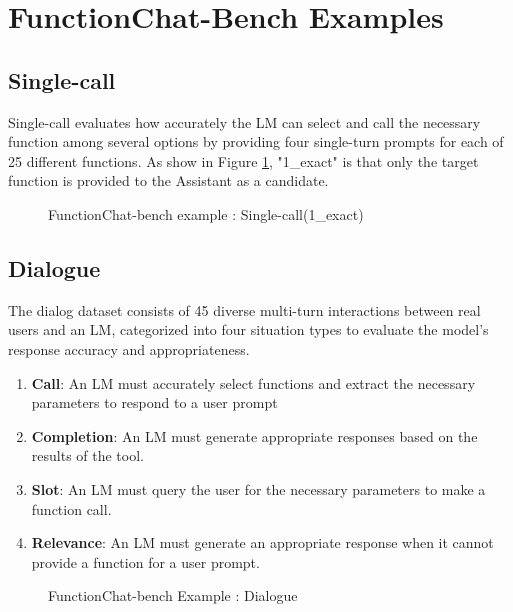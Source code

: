 \section{FunctionChat-Bench Examples}\label{appendix:fc-bench-example}
\subsection{Single-call}
Single-call evaluates how accurately the LM can select and call the necessary function among several options by providing four single-turn prompts for each of 25 different functions. As show in Figure \ref{fig:fc-appendix-single}, "1\_exact" is that only the target function is provided to the Assistant as a candidate.
    \begin{figure}[h]
    \centering
    \caption{FunctionChat-bench example : Single-call(1\_exact)}
    \label{fig:fc-appendix-single}
    \end{figure}

\subsection{Dialogue}
The dialog dataset consists of 45 diverse multi-turn interactions between real users and an LM, categorized into four situation types to evaluate the model's response accuracy and appropriateness.
\begin{enumerate}
    \item \textbf{Call}: An LM must accurately select functions and extract the necessary parameters to respond to a user prompt
    \item \textbf{Completion}: An LM must generate appropriate responses based on the results of the tool.
    \item \textbf{Slot}: An LM must query the user for the necessary parameters to make a function call.
    \item \textbf{Relevance}: An LM must generate an appropriate response when it cannot provide a function for a user prompt.
\end{enumerate}

    \begin{figure}[h]
    \centering
    \caption{FunctionChat-bench Example : Dialogue}
    \label{fig:fc-appendix-dialogue}
    \end{figure}
